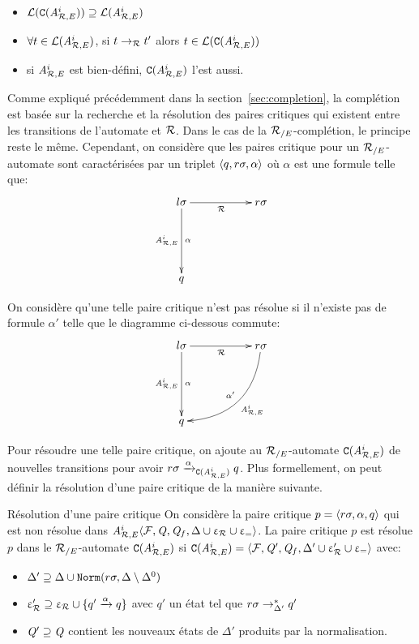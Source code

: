 \begin{itemize}
\item $\mathcal{L}(\mathtt{C}({\mathit A}_{\mathcal R,E}^i)) \supseteq \mathcal{L}({\mathit A}_{\mathcal R,E}^i)$
\item $\forall t \in \mathcal{L}({\mathit A}_{\mathcal R,E}^i)$, si $t \rightarrow_\mathcal R t'$ alors $t \in \mathcal{L}(\mathtt{C}({\mathit A}_{\mathcal R,E}^i))$
\item si ${\mathit A}_{\mathcal R,E}^i$ est bien-défini, $\mathtt{C}({\mathit A}_{\mathcal R,E}^i)$ l'est aussi.
\end{itemize}


Comme expliqué précédemment dans la section~\ref{sec:completion}, la complétion est basée sur
la recherche et la résolution des paires critiques qui existent entre les transitions de l'automate 
et $\mathcal R$. Dans le cas de la ${\mathcal R_{/E}}$-complétion, le principe reste le même. Cependant, on considère
que les paires critique pour un ${\mathcal R_{/E}}$-automate sont caractérisées par un triplet $\langle q, r\sigma, \alpha\rangle$
où $\alpha$ est une formule telle que:
  \[
  \xymatrix{
    l\sigma \ar[dd]_{\aaexeq^i}^{\alpha} \ar[rr]_{\R} && r\sigma\\
    \\
    q
  }
  \]

On considère qu'une telle paire critique n'est pas résolue si il n'existe pas de formule $\alpha'$ telle que 
le diagramme ci-dessous commute:
  \[
  \xymatrix{
    l\sigma \ar[dd]_{\aaexeq^i}^{\alpha} \ar[rr]_{\R} && r\sigma \ar@/^1.8pc/[ddll]_{\alpha'}^{\aaexeq^i}\\
    \\
    q
  }
  \]

Pour résoudre une telle paire critique, on ajoute au ${\mathcal R_{/E}}$-automate $\mathtt{C}({\mathit A}_{\mathcal R,E}^i)$
de nouvelles transitions pour avoir $r\sigma \xrightarrow{\alpha}_{\mathtt{C}({\mathit A}_{\mathcal R,E}^{i})} q$.
Plus formellement, on peut définir la résolution d'une paire critique de la manière suivante.

\begin{definition}{Résolution d'une paire critique}
  \label{def:resolution_cp}
  On considère la paire critique $p=\langle r\sigma, \alpha, q \rangle$ qui est non résolue dans
  ${\mathit A}_{\mathcal R,E}^i \langle \mathcal{F}, \mathit Q, \mathit Q_f, \Delta\cup \upvarepsilon_{\mathcal R}\cup \upvarepsilon_{=} \rangle$.
  La paire critique $p$ est résolue $p$ dans le ${\mathcal R_{/E}}$-automate $\mathtt{C}({\mathit A}_{\mathcal R,E}^i)$
  si $\mathtt{C}({\mathit A}_{\mathcal R,E}^i) = \langle \mathcal{F}, \mathit Q', \mathit Q_f, \Delta'\cup \upvarepsilon_{\mathcal R}'\cup \upvarepsilon_{=} \rangle$ avec:
  \begin{itemize}
  \item $\Delta'\supseteq \Delta \cup \mathtt{Norm}(r\sigma,\Delta\setminus \Delta^0)$
  \item $\upvarepsilon_{\mathcal R}'\supseteq \upvarepsilon_{\mathcal R} \cup \{q' \xrightarrow{\alpha} q\}$ avec $q'$ un état tel que $r\sigma \rightarrow^*_{\Delta'} q'$
  \item $\mathit Q' \supseteq \mathit Q$ contient les nouveaux états de $\Delta'$ produits par la normalisation.
  \end{itemize}
\end{definition}

